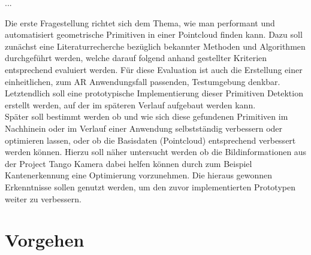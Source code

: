 ...

Die erste Fragestellung richtet sich dem Thema, wie man performant und automatisiert geometrische Primitiven in einer Pointcloud finden kann. Dazu soll zunächst eine Literaturrecherche bezüglich bekannter Methoden und Algorithmen durchgeführt werden, welche darauf folgend anhand gestellter Kriterien entsprechend evaluiert werden. Für diese Evaluation ist auch die Erstellung einer einheitlichen, zum AR Anwendungsfall passenden, Testumgebung denkbar. Letztendlich soll eine prototypische Implementierung dieser Primitiven Detektion erstellt werden, auf der im späteren Verlauf aufgebaut werden kann.\\

Später soll bestimmt werden ob und wie sich diese gefundenen Primitiven im Nachhinein oder im Verlauf einer Anwendung selbstständig verbessern oder optimieren lassen, oder ob die Basisdaten (Pointcloud) entsprechend verbessert werden können. Hierzu soll näher untersucht werden ob die Bildinformationen aus der Project Tango Kamera dabei helfen können durch zum Beispiel Kantenerkennung eine Optimierung vorzunehmen. Die hieraus gewonnen Erkenntnisse sollen genutzt werden, um den zuvor implementierten Prototypen weiter zu verbessern.\\

\section{Vorgehen}